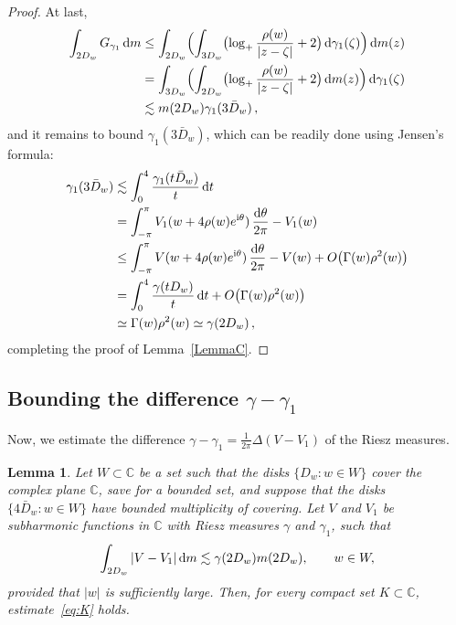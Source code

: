 \documentclass[11pt]{amsart}
\numberwithin{equation}{section}
\newtheorem{lemma}{Lemma}[section]
\newcommand{\bC}{\mathbb C}
\begin{document}
\begin{proof}
At last,
\begin{align*}
\int_{2D_w} G_{\gamma_1}\, {\rm d}m &\le \int_{2D_w} \Bigl(
\int_{3D_w} \bigl( \log_+ \frac{\rho(w)}{|z-\zeta|} + 2 \bigr)\, {\rm d}\gamma_1 (\zeta)
\Bigr)\, {\rm d}m(z) \\
&= \int_{3D_w} \Bigl(
\int_{2D_w} \bigl( \log_+ \frac{\rho(w)}{|z-\zeta|} + 2 \bigr)\, {\rm d} m(z) \Bigr)\,
{\rm d} \gamma_1 (\zeta) \\
&\lesssim m(2D_w) \gamma_1(3\bar D_w)\,,
\end{align*}
and it remains to bound $\gamma_1(3\bar D_w)$, which can be readily done using Jensen's formula:
\begin{align*}
\gamma_1(3\bar D_w) &\lesssim \int_0^{4} \frac{\gamma_1(t\bar D_w)}{t}\, {\rm d}t \\
&= \int_{-\pi}^\pi V_1(w+4\rho(w)e^{{\rm i}\theta})\, \frac{{\rm d}\theta}{2\pi} - V_1(w) \\
&\le \int_{-\pi}^\pi V(w+4\rho(w)e^{{\rm i}\theta})\, \frac{{\rm d}\theta}{2\pi} - V(w) +
O\bigl( \Gamma(w)\rho^2(w) \bigr) \\
&= \int_0^{4} \frac{\gamma(tD_w)}{t}\, {\rm d}t + O\bigl( \Gamma(w)\rho^2(w) \bigr) \\
&\simeq \Gamma(w)\rho^2(w) \simeq \gamma (2D_w)\,,
\end{align*}
completing the proof of Lemma~\ref{LemmaC}. 
\end{proof}

\subsection{Bounding the difference $\gamma-\gamma_1$}

Now, we estimate the difference $\gamma-\gamma_1 = \tfrac1{2\pi}\Delta (V-V_1)$
of the Riesz measures.

\begin{lemma}\label{LemmaD}
Let $W\subset \bC$ be a set such that
the disks $\{D_w\colon w\in W\}$ cover the complex plane $\bC$, save for
a bounded set, and suppose that the disks $\{4\bar D_w\colon w\in W\}$
have bounded multiplicity of covering.
Let $V$ and $V_1$ be subharmonic functions in $\bC$ with Riesz measures
$\gamma$ and $\gamma_1$, such that
\[
\int_{2D_w} |V-V_1|\, {\rm d}m \lesssim \gamma(2D_w) m(2D_w), \qquad w\in W,
\]
provided that $|w|$ is sufficiently large.
Then, for every compact set $K\subset\bC$, estimate~\eqref{eq:K} holds.
\end{lemma}
\end{document}
